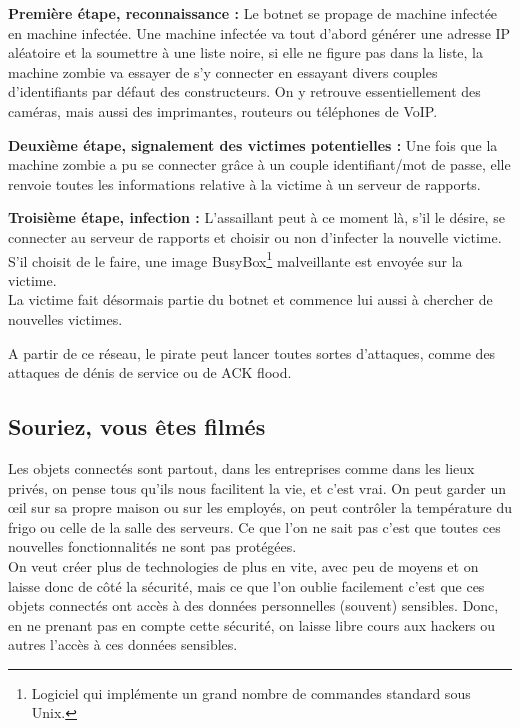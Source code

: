\documentclass[a4paper]{report}
\begin{document}
	\textbf{Première étape, reconnaissance :} Le botnet se propage de machine infectée en machine infectée. Une machine infectée 
	va tout d'abord générer une adresse IP aléatoire et la soumettre à une liste noire, si elle ne figure pas dans la liste, 
	la machine zombie va essayer de s'y connecter en essayant divers couples d'identifiants par défaut des constructeurs. On y retrouve 
	essentiellement des caméras, mais aussi des imprimantes, routeurs ou téléphones de VoIP.
	
	\medbreak

	\textbf{Deuxième étape, signalement des victimes potentielles :} Une fois que la machine zombie a pu se connecter grâce à un couple
	identifiant/mot de passe, elle renvoie toutes les informations relative à la victime à un serveur de rapports.
	
	\medbreak
	
	\textbf{Troisième étape, infection :} L'assaillant peut à ce moment là, s'il le désire, se connecter au serveur de rapports et choisir
	ou non d'infecter la nouvelle victime. S'il choisit de le faire, une image
	BusyBox\footnote{Logiciel qui implémente un grand nombre de commandes standard sous Unix.} malveillante est envoyée sur la victime. \\
	La victime fait désormais partie du botnet et commence lui aussi à chercher de nouvelles victimes.
	
	\medbreak
	A partir de ce réseau, le pirate peut lancer toutes sortes d'attaques, comme des attaques de dénis de service ou de ACK flood.
	
	\subsection{Souriez, vous êtes filmés}
	Les objets connectés sont partout, dans les entreprises comme dans les lieux privés, on pense tous qu'ils nous facilitent la vie, et c'est vrai. On peut garder un œil sur sa propre maison ou sur les employés, on peut contrôler la température du frigo ou celle de la salle des serveurs. Ce que l'on ne sait pas c'est que toutes ces nouvelles fonctionnalités ne sont pas protégées.\\ 
	
	On veut créer plus de technologies de plus en vite, avec peu de moyens et on laisse donc de côté la sécurité, mais ce que l'on oublie facilement c'est que ces objets connectés ont accès à des données personnelles (souvent) sensibles. Donc, en ne prenant pas en compte cette sécurité, on laisse libre cours aux hackers ou autres l'accès à ces données sensibles. \\ 
	
\end{document}
